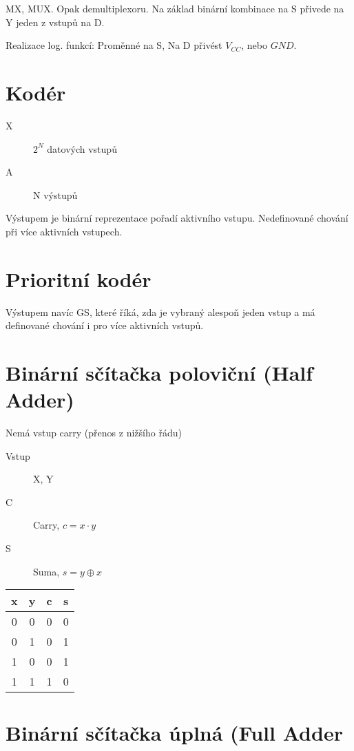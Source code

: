 \documentclass[a4wide]{report}
\begin{document}
MX, MUX. Opak demultiplexoru. Na základ binární kombinace na S přivede na Y jeden z vstupů na D.

Realizace log. funkcí: Proměnné na S, Na D přivést $V_{CC}$, nebo $GND$.

\section{Kodér}

\begin{description}
	\item[X] $2^N$ datových vstupů
	\item[A] N výstupů
\end{description}

Výstupem je binární reprezentace pořadí aktivního vstupu. Nedefinované chování při více aktivních vstupech.

\section{Prioritní kodér}

Výstupem navíc GS, které říká, zda je vybraný alespoň jeden vstup a má definované chování i pro více aktivních vstupů.

\section{Binární sčítačka poloviční (Half Adder)}

Nemá vstup carry (přenos z nižšího řádu)

\begin{description}
	\item[Vstup] X, Y
	\item[C] Carry, $ c = x \cdot y$
	\item[S] Suma, $ s = y \oplus x$
\end{description}

\begin{tabular}{ |c | c | c | c |}
 \hline
 x & y & c & s \\ \hline
 0 & 0 & 0 & 0 \\
 0 & 1 & 0 & 1 \\
 1 & 0 & 0 & 1 \\
 1 & 1 & 1 & 0 \\ \hline
\end{tabular}

\section{Binární sčítačka úplná (Full Adder}
\end{document}
